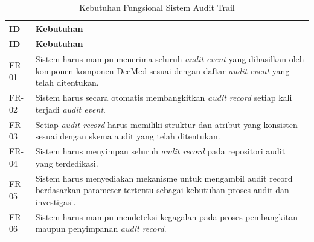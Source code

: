 \begin{xltabular}{\textwidth}{|p{2cm}|X|}
\caption{Kebutuhan Fungsional Sistem Audit Trail}
\label{tab:kebutuhan_fungsional}\\

\hline
\textbf{ID} & \textbf{Kebutuhan}\\
\hline
\endfirsthead

\hline
\textbf{ID} & \textbf{Kebutuhan}\\
\hline
\endhead

\hline
\endfoot

FR-01 &
Sistem harus mampu menerima seluruh \textit{audit event} yang dihasilkan oleh komponen-komponen DecMed sesuai dengan daftar \textit{audit event} yang telah ditentukan.\\
\hline

FR-02 &
Sistem harus secara otomatis membangkitkan \textit{audit record} setiap kali terjadi \textit{audit event}.\\
\hline

FR-03 &
Setiap \textit{audit record} harus memiliki struktur dan atribut yang konsisten sesuai dengan skema audit yang telah ditentukan.\\
\hline

FR-04 &
Sistem harus menyimpan seluruh \textit{audit record} pada repositori audit yang terdedikasi.\\
\hline

FR-05 &
Sistem harus menyediakan mekanisme untuk mengambil audit record berdasarkan parameter tertentu sebagai kebutuhan proses audit dan investigasi.\\
\hline

FR-06 &
Sistem harus mampu mendeteksi kegagalan pada proses pembangkitan maupun penyimpanan \textit{audit record}.\\
\hline

\end{xltabular}

